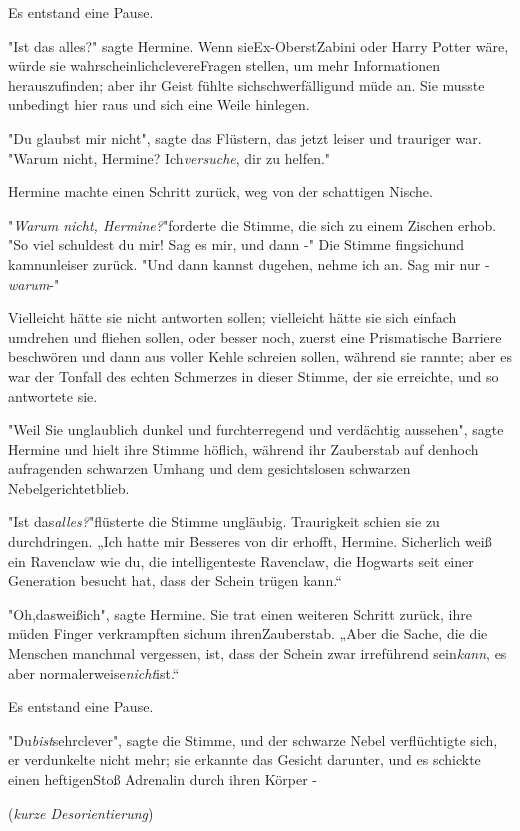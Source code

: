 {Es entstand eine Pause.

"Ist das alles?" sagte Hermine. Wenn sieEx-OberstZabini oder Harry Potter wäre, würde sie wahrscheinlichclevereFragen stellen, um mehr Informationen herauszufinden; aber ihr Geist fühlte sichschwerfälligund müde an. Sie musste unbedingt hier raus und sich eine Weile hinlegen.

"Du glaubst mir nicht", sagte das Flüstern, das jetzt leiser und trauriger war. "Warum nicht, Hermine? Ich\emph{versuche}, dir zu helfen."

Hermine machte einen Schritt zurück, weg von der schattigen Nische.

"\emph{Warum nicht, Hermine?}"forderte die Stimme, die sich zu einem Zischen erhob. "So viel schuldest du mir! Sag es mir, und dann -" Die Stimme fingsichund kamnunleiser zurück. "Und dann kannst dugehen, nehme ich an. Sag mir nur -\emph{warum}-"

Vielleicht hätte sie nicht antworten sollen; vielleicht hätte sie sich einfach umdrehen und fliehen sollen, oder besser noch, zuerst eine Prismatische Barriere beschwören und dann aus voller Kehle schreien sollen, während sie rannte; aber es war der Tonfall des echten Schmerzes in dieser Stimme, der sie erreichte, und so antwortete sie.

"Weil Sie unglaublich dunkel und furchterregend und verdächtig aussehen", sagte Hermine und hielt ihre Stimme höflich, während ihr Zauberstab auf denhoch aufragenden schwarzen Umhang und dem gesichtslosen schwarzen Nebelgerichtetblieb.

"Ist das\emph{alles?}"flüsterte die Stimme ungläubig. Traurigkeit schien sie zu durchdringen. „Ich hatte mir Besseres von dir erhofft, Hermine. Sicherlich weiß ein Ravenclaw wie du, die intelligenteste Ravenclaw, die Hogwarts seit einer Generation besucht hat, dass der Schein trügen kann.“

"Oh,dasweißich", sagte Hermine. Sie trat einen weiteren Schritt zurück, ihre müden Finger verkrampften sichum ihrenZauberstab. „Aber die Sache, die die Menschen manchmal vergessen, ist, dass der Schein zwar irreführend sein\emph{kann}, es aber normalerweise\emph{nicht}ist.“

Es entstand eine Pause.

"Du\emph{bist}sehrclever", sagte die Stimme, und der schwarze Nebel verflüchtigte sich, er verdunkelte nicht mehr; sie erkannte das Gesicht darunter, und es schickte einen heftigenStoß Adrenalin durch ihren Körper -

(\emph{kurze Desorientierung})

}
